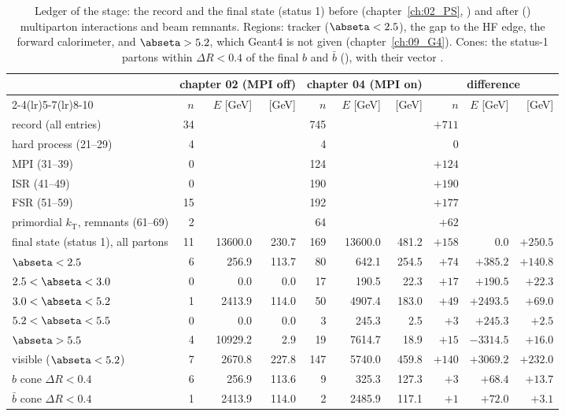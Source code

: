 \begin{table}[htb]
\centering\small
\caption{Ledger of the stage: the record and the final state (status 1) before (chapter~\ref{ch:02_PS},
) and after () multiparton interactions and beam remnants. Regions:
tracker ($\abseta<2.5$), the gap to the HF edge, the forward calorimeter, and $\abseta>5.2$, which Geant4 is not
given (chapter~\ref{ch:09_G4}). Cones: the status-1 partons within $\Delta R<0.4$ of the final $b$ and $\bar b$
(), with their vector \pt.}
\label{tab:04_ledger}
\footnotesize\setlength{\tabcolsep}{3.2pt}
\begin{tabular}{lrrrrrrrrr}
\toprule
 & \multicolumn{3}{c}{chapter 02 (MPI off)} & \multicolumn{3}{c}{chapter 04 (MPI on)} & \multicolumn{3}{c}{difference} \\
\cmidrule(lr){2-4}\cmidrule(lr){5-7}\cmidrule(lr){8-10}
 & $n$ & $E$ [GeV] & \pt{} [GeV] & $n$ & $E$ [GeV] & \pt{} [GeV] & $n$ & $E$ [GeV] & \pt{} [GeV] \\
\midrule
record (all entries) & 34 & & & 745 & & & $+711$ & & \\
\quad hard process (21--29) & 4 & & & 4 & & & 0 & & \\
\quad MPI (31--39) & 0 & & & 124 & & & $+124$ & & \\
\quad ISR (41--49) & 0 & & & 190 & & & $+190$ & & \\
\quad FSR (51--59) & 15 & & & 192 & & & $+177$ & & \\
\quad primordial $k_\mathrm{T}$, remnants (61--69) & 2 & & & 64 & & & $+62$ & & \\
\midrule
final state (status 1), all partons & 11 & 13600.0 & 230.7 & 169 & 13600.0 & 481.2 & $+158$ & 0.0 & $+250.5$ \\
\quad $\abseta<2.5$ & 6 & 256.9 & 113.7 & 80 & 642.1 & 254.5 & $+74$ & $+385.2$ & $+140.8$ \\
\quad $2.5<\abseta<3.0$ & 0 & 0.0 & 0.0 & 17 & 190.5 & 22.3 & $+17$ & $+190.5$ & $+22.3$ \\
\quad $3.0<\abseta<5.2$ & 1 & 2413.9 & 114.0 & 50 & 4907.4 & 183.0 & $+49$ & $+2493.5$ & $+69.0$ \\
\quad $5.2<\abseta<5.5$ & 0 & 0.0 & 0.0 & 3 & 245.3 & 2.5 & $+3$ & $+245.3$ & $+2.5$ \\
\quad $\abseta>5.5$ & 4 & 10929.2 & 2.9 & 19 & 7614.7 & 18.9 & $+15$ & $-3314.5$ & $+16.0$ \\
\quad visible ($\abseta<5.2$) & 7 & 2670.8 & 227.8 & 147 & 5740.0 & 459.8 & $+140$ & $+3069.2$ & $+232.0$ \\
\midrule
$b$ cone $\Delta R<0.4$ & 6 & 256.9 & 113.6 & 9 & 325.3 & 127.3 & $+3$ & $+68.4$ & $+13.7$ \\
$\bar b$ cone $\Delta R<0.4$ & 1 & 2413.9 & 114.0 & 2 & 2485.9 & 117.1 & $+1$ & $+72.0$ & $+3.1$ \\
\bottomrule
\end{tabular}
\end{table}

